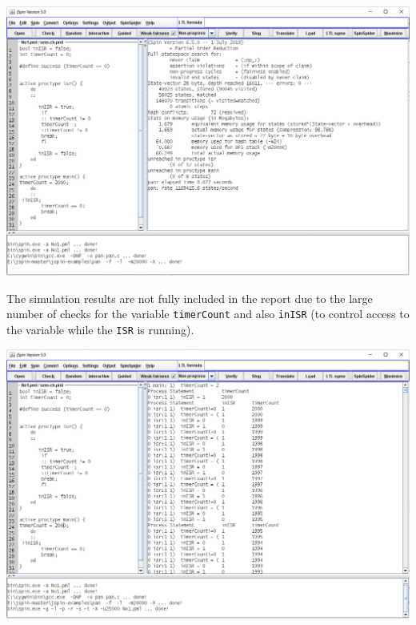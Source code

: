 \documentclass[12pt]{article}
\begin{document}
\begin{qsolve}
	\begin{center}
		\includegraphics*[width=0.9\linewidth]{images/img2}
	\end{center}
	
	
	The simulation results are not fully included in the report due to the large number of checks for the variable \texttt{timerCount} and also \texttt{inISR} (to control access to the variable while the \texttt{ISR} is running).
	
	\begin{center}
		\includegraphics*[width=0.9\linewidth]{images/img3}
	\end{center}
\end{qsolve}
\end{document}
